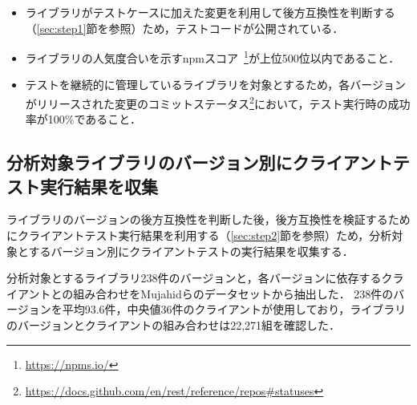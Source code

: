 \documentclass[submit]{ipsj}
\begin{document}
\begin{itemize}
\item ライブラリがテストケースに加えた変更を利用して後方互換性を判断する（\ref{sec:step1}節を参照）ため，テストコードが公開されている．
\item ライブラリの人気度合いを示すnpmスコア~\footnote{\url{https://npms.io/}}が上位500位以内であること．
\item テストを継続的に管理しているライブラリを対象とするため，各バージョンがリリースされた変更のコミットステータス\footnote{\url{https://docs.github.com/en/rest/reference/repos#statuses}}において，テスト実行時の成功率が100\%であること．
\end{itemize}




\subsection{分析対象ライブラリのバージョン別にクライアントテスト実行結果を収集}
\label{sec:experiment}
ライブラリのバージョンの後方互換性を判断した後，後方互換性を検証するためにクライアントテスト実行結果を利用する（\ref{sec:step2}節を参照）ため，分析対象とするバージョン別にクライアントテストの実行結果を収集する．

分析対象とするライブラリ238件のバージョンと，各バージョンに依存するクライアントとの組み合わせをMujahidらのデータセットから抽出した．
238件のバージョンを平均93.6件，中央値36件のクライアントが使用しており，ライブラリのバージョンとクライアントの組み合わせは22,271組を確認した．
\end{document}
